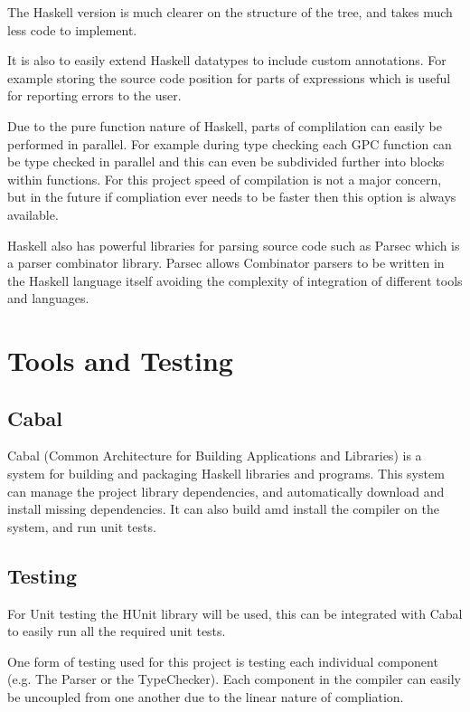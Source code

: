 The Haskell version is much clearer on the structure of the tree, and takes much
less code to implement. 

It is also to easily extend Haskell datatypes to include
custom annotations. For example storing the source code position for parts of expressions 
which is useful for reporting errors to the user.

Due to the pure function nature of Haskell, parts of complilation can easily be performed in parallel.
For example during type checking each GPC function can be type checked in parallel and this can even be subdivided 
further into blocks within functions. For this project speed of compilation is not a major concern, but in the future if compliation ever
needs to be faster then this option is always available.

Haskell also has powerful libraries for parsing source code such as Parsec which is a parser combinator
library. Parsec allows Combinator parsers to be written in the Haskell language itself avoiding the complexity
of integration of different tools and languages\cite{parsec}. 

\section{Tools and Testing}


\subsection{Cabal}

Cabal (Common Architecture for Building Applications and Libraries) is a system for building and
packaging Haskell libraries and programs\cite{cabal}. This system can manage the
project library dependencies, and automatically download and install missing dependencies.
It can also build amd install the compiler on the system, and run unit tests.

\subsection{Testing}

For Unit testing the HUnit library will be used, this can be integrated
with Cabal to easily run all the required unit tests.

One form of testing used for this project is testing each individual component
(e.g. The Parser or the TypeChecker). Each component in the compiler can easily
be uncoupled from one another due to the linear nature of compliation.

